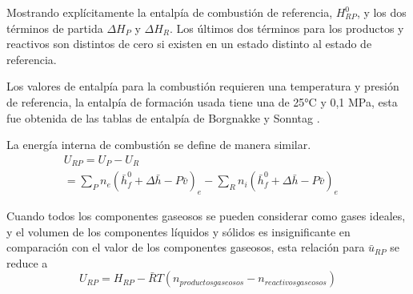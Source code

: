 \par Mostrando explícitamente la entalpía de combustión de referencia, $H^0_{RP}$, y los dos términos de partida $\Delta H_{P}$ y $\Delta H_{R}$. Los últimos dos términos para los productos y reactivos son distintos de cero si existen en un estado distinto al estado de referencia.
\par Los valores de entalpía para la combustión requieren una temperatura y presión de referencia, la entalpía de formación usada tiene una de 25°C y 0,1 MPa, esta fue obtenida de las tablas de entalpía de Borgnakke y Sonntag \cite{bib:vanwylen}.
\par La energía interna de combustión se define de manera similar.
\begin{equation}
\begin{gathered}
    U_{RP} = U_{P} - U_{R} \quad\quad\quad\quad\quad
    \quad\quad\quad\quad\quad\quad\quad\quad\quad\quad\quad\quad\quad\quad\\
    = \sum_P n_e (\bar h^0_{f} + \Delta \bar h - P\bar v)_{e} - \sum_R n_i (\bar h^0_{f} + \Delta \bar h - P\bar v)_{e}
\end{gathered}
\end{equation}
\par Cuando todos los componentes gaseosos se pueden considerar como gases ideales, y el volumen de los componentes líquidos y sólidos es insignificante en comparación con el valor de los componentes gaseosos, esta relación para $\bar u_{RP}$ se reduce a
\begin{equation}
        U_{RP} = H_{RP} - \bar RT (n_{productos gaseosos} - n_{reactivos gaseosos})
\end{equation}

